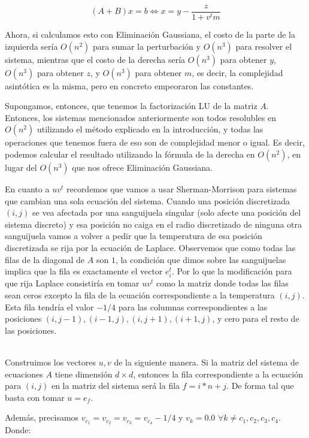 $$(A+B)x = b \iff x = y - \frac{z}{1 + v^t m}$$

Ahora, si calculamos esto con Eliminación Gaussiana, el costo de la parte de la izquierda sería $O(n^2)$ para sumar la perturbación y $O(n^3)$ para resolver el sistema, mientras que el costo de la derecha sería $O(n^3)$ para obtener $y$, $O(n^3)$ para obtener $z$, y $O(n^3)$ para obtener $m$, es decir, la complejidad asintótica es la misma, pero en concreto empeoraron las constantes.

Supongamos, entonces, que tenemos la factorización LU de la matriz $A$. Entonces, los sistemas mencionados anteriormente son todos resolubles en $O(n^2)$ utilizando el método explicado en la introducción, y todas las operaciones que tenemos fuera de eso son de complejidad menor o igual. Es decir, podemos calcular el resultado utilizando la fórmula de la derecha en $O(n^2)$, en lugar del $O(n^3)$ que nos ofrece Eliminación Gaussiana.

En cuanto a $uv^{t}$ recordemos que vamos a usar Sherman-Morrison para sistemas que cambian una sola ecuación del sistema. Cuando una posición discretizada $(i, j)$ se vea afectada por una sanguijuela singular (solo afecte una posición del sistema discreto) y esa posición no caiga en el radio discretizado de ninguna otra sanguijuela vamos a volver a pedir que la temperatura de esa posición discretizada se rija por la ecuación de Laplace. Observemos que como todas las filas de la diagonal de $A$ son $1$, la condición que dimos sobre las sanguijuelas implica que la fila es exactamente el vector $e_i^t$. Por lo que la modificación para que rija Laplace consistiría en tomar $uv^{t}$ como la matriz donde todas las filas sean ceros excepto la fila de la ecuación correspondiente a la temperatura $(i, j)$. Esta fila tendría el valor $-1/4$ para las columnas correspondientes a las posiciones ${(i,j-1), (i-1,j), (i,j+1), (i+1,j)}$, y cero para el resto de las posiciones.\\\

Construimos los vectores $u, v$ de la siguiente manera. Si la matriz del sistema de ecuaciones $A$ tiene dimensión $d \times d$, entonces la fila correspondiente a la ecuación para $(i, j)$ en la matriz del sistema será la fila $f = i*n + j$. De forma tal que basta con tomar $u = e_f$.

Además, precisamos $v_{c_{1}} = v_{c_{2}} = v_{c_{3}} = v_{c_{4}} -1/4$ y $v_{k} = 0.0$ $ \forall k \neq c_{1},c_{2},c_{3},c_{4}$. Donde: \\

